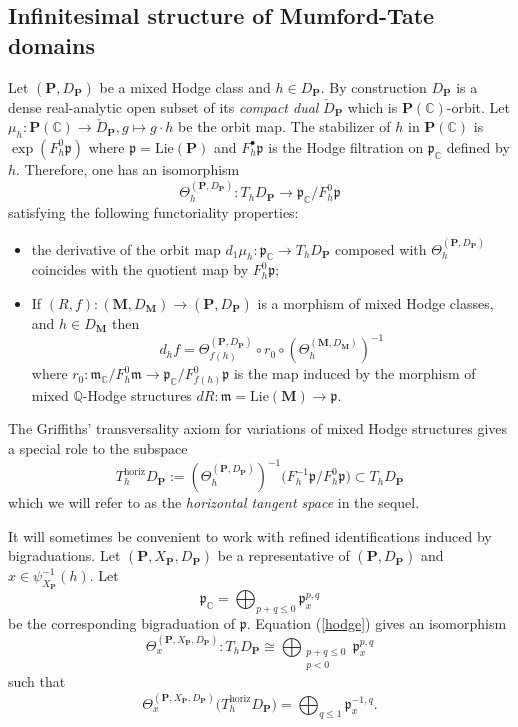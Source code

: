\documentclass[10pt]{article}
\numberwithin{equation}{subsection}
\theoremstyle{plain}
\theoremstyle{definition}
\theoremstyle{remark}
\newcommand{\lie}{\mathrm{Lie}}
\newcommand{\Q}{\mathbb Q}
\newcommand{\C}{\mathbb C}
\newcommand{\pp}{\mathbf P}
\newcommand{\M}{\mathbf M}
\newcommand{\bul}{\bullet}
\newcommand{\para}{\mathfrak{p}}
\newcommand{\mt}{\mathfrak{m}}
\begin{document}
\subsection{Infinitesimal structure of Mumford-Tate domains}
Let $(\pp, D_\pp)$ be a mixed Hodge class and $h \in D_\pp$. By construction $D_\pp$ is a dense real-analytic open subset of its \textit{compact dual} $\check{D}_\pp$ which is $\pp(\C)$-orbit. Let $\mu_h : \pp(\C) \rightarrow \check{D}_\pp, g \mapsto g \cdot h$ be the orbit map. The stabilizer of $h$ in $\pp(\C)$ is $\exp(F_h^0 \para)$ where $\para = \lie(\pp)$ and $F_h^\bul \para$ is the Hodge filtration on $\para_\C$ defined by $h$. Therefore, one has an isomorphism
\[
\Theta^{(\pp,D_\pp)}_h : T_h D_\pp \rightarrow \para_\C / F_h^0 \para
\]
satisfying the following functoriality properties:
\begin{itemize}
\item[$(i)$] the derivative of the orbit map $d_1 \mu_h : \para_\C \rightarrow T_h D_\pp$ composed with $\Theta^{(\pp, D_\pp)}_h$ coincides with the quotient map by $F^0_h \para$;
\item[$(ii)$] If $(R,f) : (\M, D_\M) \rightarrow (\pp, D_\pp)$ is a morphism of mixed Hodge classes, and $h \in D_\M$ then 
\[
d_h f = \Theta^{(\pp, D_\pp)}_{f(h)} \circ r_0 \circ  (\Theta^{(\M, D_\M)}_{h})^{-1}
\]
where $r_0 : \mt_\C/F^0_h \mt \rightarrow \para_\C / F^0_{f(h)} \para$ is the map induced by the morphism of mixed $\Q$-Hodge structures $dR : \mt = \lie(\M) \rightarrow \para$.
\end{itemize}
The Griffiths' transversality axiom for variations of mixed Hodge structures gives a special role to the subspace
\[
T_h^{\mathrm{horiz}} D_\pp := (\Theta^{(\pp, D_\pp)}_h)^{-1}\big(F_h^{-1} \para/ F_h^0\para\big) \subset T_h D_\pp
\]
which we will refer to as the \textit{horizontal tangent space} in the sequel. 

It will sometimes be convenient to work with refined identifications induced by bigraduations. Let $(\pp, X_\pp, D_\pp)$ be a representative of $(\pp, D_\pp)$ and $x \in \psi_{X_\pp}^{-1}(h)$. Let
\[ \para_\C = \bigoplus_{p+q \leqslant 0} \para_x^{p,q} \]
be the corresponding bigraduation of $\para$. Equation (\ref{hodge}) gives an isomorphism
\[
\Theta^{(\pp,X_\pp, D_\pp)}_x : T_h D_\pp \cong \bigoplus_{\substack{p+q \leqslant 0 \\ p < 0}} \para_x^{p,q}
\]
such that
\[
\Theta^{(\pp,X_\pp, D_\pp)}_x\big(T_h^{\mathrm{horiz}}D_\pp \big) = \bigoplus_{q \leqslant 1} \para_x^{-1,q}.
\]
\end{document}

